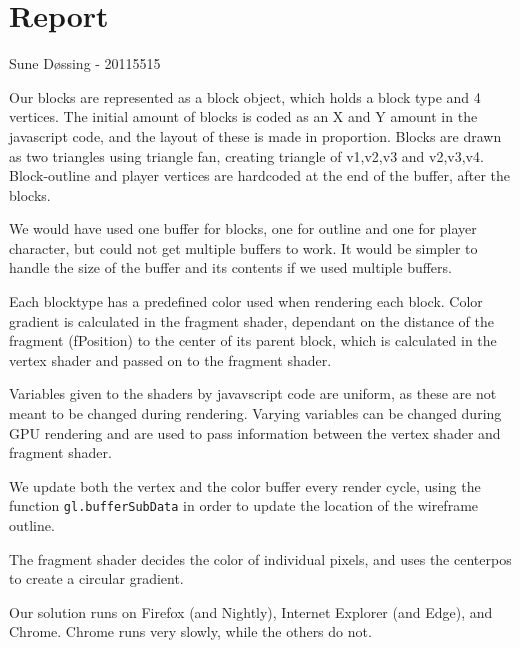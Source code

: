 \section{Report}

Sune D\o ssing - 20115515



Our blocks are represented as a block object, which holds a block type and 4 vertices.
The initial amount of blocks is coded as an X and Y amount in the javascript code,
and the layout of these is made in proportion.
Blocks are drawn as two triangles using triangle fan, creating triangle of v1,v2,v3 and v2,v3,v4.
Block-outline and player vertices are hardcoded at the end of the buffer, after the blocks.

We would have used one buffer for blocks, 
one for outline and one for player character, 
but could not get multiple buffers to work.
It would be simpler to handle the size of the buffer and its contents if we used multiple buffers.


Each blocktype has a predefined color used when rendering each block.
Color gradient is calculated in the fragment shader, 
dependant on the distance of the fragment (fPosition) to the center of its parent block,
which is calculated in the vertex shader and passed on to the fragment shader.


Variables given to the shaders by javavscript code are uniform, 
as these are not meant to be changed during rendering.
Varying variables can be changed during GPU rendering and are 
used to pass information between the vertex shader and fragment shader.


We update both the vertex and the color buffer every render cycle, 
using the function \texttt{gl.bufferSubData} %
in order to update the location of the wireframe outline. 



The fragment shader decides the color of individual pixels, 
and uses the centerpos to create a circular gradient.


Our solution runs on Firefox (and Nightly), Internet Explorer (and Edge), and Chrome.
Chrome runs very slowly, while the others do not.